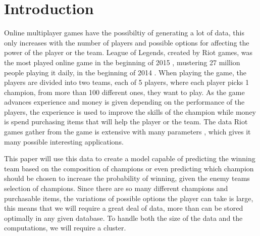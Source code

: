 \section{Introduction}\label{sec:intro}

Online multiplayer games have the possibiltiy of generating a lot of data, this only increases with the number of players and possible options for affecting the power of the player or the team. League of Legends, created by Riot games, was the most played online game in the beginning of 2015 \cite{LoLmostplayed}, mustering 27 million people playing it daily, in the beginning of 2014 \cite{LoL27mill}. When playing the game, the players are divided into two teams, each of 5 players, where each player picks 1 champion, from more than 100 different ones, they want to play. As the game advances experience and money is given depending on the performance of the players, the experience is used to improve the skills of the champion while money is spend purchasing items that will help the player or the team. The data Riot games gather from the game is extensive with many parameters \cite{LoLparameters}, which gives it many possible interesting applications. 

This paper will use this data to create a model capable of predicting the winning team based on the composition of champions or even predicting which champion should be chosen to increase the probability of winning, given the enemy teams selection of champions. Since there are so many different champions and purchasable items, the variations of possible options the player can take is large, this means that we will require a great deal of data, more than can be stored optimally in any given database. To handle both the size of the data and the computations, we will require a cluster.



